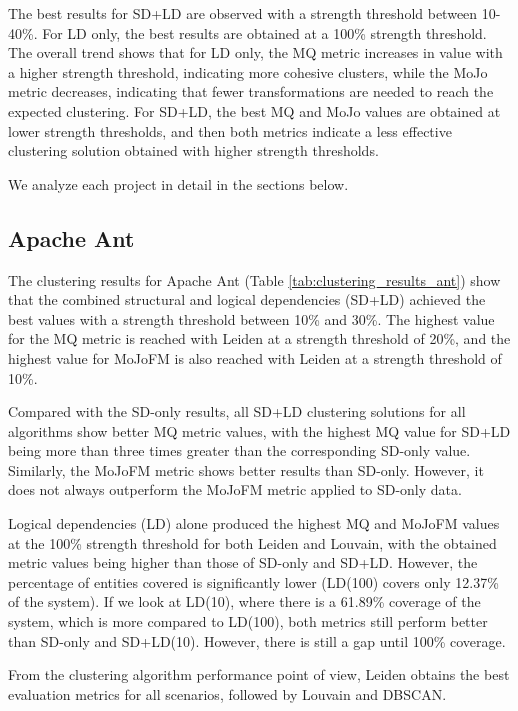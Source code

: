 \documentclass{ieeeaccess}
\begin{document}
The best results for SD+LD are observed with a strength threshold between 10-40\%. For LD only, the best results are obtained at a 100\% strength threshold. The overall trend shows that for LD only, the MQ metric increases in value with a higher strength threshold, indicating more cohesive clusters, while the MoJo metric decreases, indicating that fewer transformations are needed to reach the expected clustering. For SD+LD, the best MQ and MoJo values are obtained at lower strength thresholds, and then both metrics indicate a less effective clustering solution obtained with higher strength thresholds.

We analyze each project in detail in the sections below.

\subsection{Apache Ant}

The clustering results for Apache Ant (Table \ref{tab:clustering_results_ant}) show that the combined structural and logical dependencies (SD+LD) achieved the best values with a strength threshold between 10\% and 30\%. The highest value for the MQ metric is reached with Leiden at a strength threshold of 20\%, and the highest value for MoJoFM is also reached with Leiden at a strength threshold of 10\%.

Compared with the SD-only results, all SD+LD clustering solutions for all algorithms show better MQ metric values, with the highest MQ value for SD+LD being more than three times greater than the corresponding SD-only value. Similarly, the MoJoFM metric shows better results than SD-only. However, it does not always outperform the MoJoFM metric applied to SD-only data.

Logical dependencies (LD) alone produced the highest MQ and MoJoFM values at the 100\% strength threshold for both Leiden and Louvain, with the obtained metric values being higher than those of SD-only and SD+LD. However, the percentage of entities covered is significantly lower (LD(100) covers only 12.37\% of the system).
If we look at LD(10), where there is a 61.89\% coverage of the system, which is more compared to LD(100), both metrics still perform better than SD-only and SD+LD(10). However, there is still a gap until 100\% coverage.

From the clustering algorithm performance point of view, Leiden obtains the best evaluation metrics for all scenarios, followed by Louvain and DBSCAN.
\end{document}
